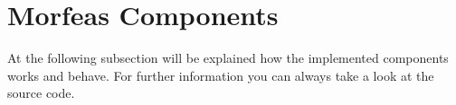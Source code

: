 \section{Morfeas Components}
At the following subsection will be explained how the implemented components works and behave. For further information you can always take a look at the source code.


